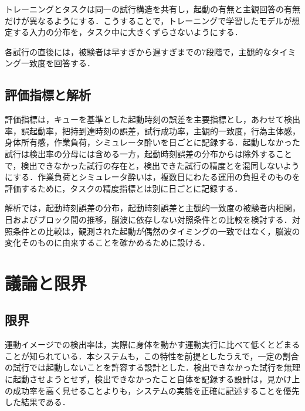 \documentclass[twoside]{wiss}
\begin{document}
トレーニングとタスクは同一の試行構造を共有し，起動の有無と主観回答の有無だけが異なるようにする．こうすることで，トレーニングで学習したモデルが想定する入力の分布を，タスク中に大きくずらさないようにする．

各試行の直後には，被験者は早すぎから遅すぎまでの7段階で，主観的なタイミング一致度を回答する．

\subsection{評価指標と解析}

評価指標は，キューを基準とした起動時刻の誤差を主要指標とし，あわせて検出率，誤起動率，把持到達時刻の誤差，試行成功率，主観的一致度，行為主体感，身体所有感，作業負荷，シミュレータ酔いを日ごとに記録する．起動しなかった試行は検出率の分母には含める一方，起動時刻誤差の分布からは除外することで，検出できなかった試行の存在と，検出できた試行の精度とを混同しないようにする．作業負荷とシミュレータ酔いは，複数日にわたる運用の負担そのものを評価するために，タスクの精度指標とは別に日ごとに記録する．

解析では，起動時刻誤差の分布，起動時刻誤差と主観的一致度の被験者内相関，日およびブロック間の推移，脳波に依存しない対照条件との比較を検討する．対照条件との比較は，観測された起動が偶然のタイミングの一致ではなく，脳波の変化そのものに由来することを確かめるために設ける．

\section{議論と限界}


\subsection{限界}

運動イメージでの検出率は，実際に身体を動かす運動実行に比べて低くとどまることが知られている．本システムも，この特性を前提としたうえで，一定の割合の試行では起動しないことを許容する設計とした．検出できなかった試行を無理に起動させようとせず，検出できなかったこと自体を記録する設計は，見かけ上の成功率を高く見せることよりも，システムの実態を正確に記述することを優先した結果である．
\end{document}
